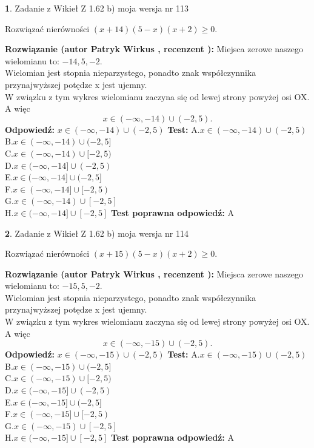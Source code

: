 \documentclass[12pt, a4paper]{article}
\theoremstyle{definition} %
\newtheorem{zad}{}
\newcommand{\zadStart}[1]{\begin{zad}#1\newline}
\newcommand{\zadStop}{\end{zad}}
\newcommand{\rozwStart}[2]{\noindent \textbf{Rozwiązanie (autor #1 , recenzent #2): }\newline}
\newcommand{\rozwStop}{\newline}
\newcommand{\odpStart}{\noindent \textbf{Odpowiedź:}\newline}
\newcommand{\odpStop}{\newline}
\newcommand{\testStart}{\noindent \textbf{Test:}\newline}
\newcommand{\testStop}{\newline}
\newcommand{\kluczStart}{\noindent \textbf{Test poprawna odpowiedź:}\newline}
\newcommand{\kluczStop}{\newline}
\begin{document}
\zadStart{Zadanie z Wikieł Z 1.62 b) moja wersja nr 113}

Rozwiązać nierówności $(x+14)(5-x)(x+2)\ge0$.
\zadStop
\rozwStart{Patryk Wirkus}{}
Miejsca zerowe naszego wielomianu to: $-14, 5, -2$.\\
Wielomian jest stopnia nieparzystego, ponadto znak współczynnika przy\linebreak najwyższej potędze x jest ujemny.\\ W związku z tym wykres wielomianu zaczyna się od lewej strony powyżej osi OX. A więc $$x \in (-\infty,-14) \cup (-2,5).$$
\rozwStop
\odpStart
$x \in (-\infty,-14) \cup (-2,5)$
\odpStop
\testStart
A.$x \in (-\infty,-14) \cup (-2,5)$\\
B.$x \in (-\infty,-14) \cup (-2,5]$\\
C.$x \in (-\infty,-14) \cup [-2,5)$\\
D.$x \in (-\infty,-14] \cup (-2,5)$\\
E.$x \in (-\infty,-14] \cup (-2,5]$\\
F.$x \in (-\infty,-14] \cup [-2,5)$\\
G.$x \in (-\infty,-14) \cup [-2,5]$\\
H.$x \in (-\infty,-14] \cup [-2,5]$
\testStop
\kluczStart
A
\kluczStop



\zadStart{Zadanie z Wikieł Z 1.62 b) moja wersja nr 114}

Rozwiązać nierówności $(x+15)(5-x)(x+2)\ge0$.
\zadStop
\rozwStart{Patryk Wirkus}{}
Miejsca zerowe naszego wielomianu to: $-15, 5, -2$.\\
Wielomian jest stopnia nieparzystego, ponadto znak współczynnika przy\linebreak najwyższej potędze x jest ujemny.\\ W związku z tym wykres wielomianu zaczyna się od lewej strony powyżej osi OX. A więc $$x \in (-\infty,-15) \cup (-2,5).$$
\rozwStop
\odpStart
$x \in (-\infty,-15) \cup (-2,5)$
\odpStop
\testStart
A.$x \in (-\infty,-15) \cup (-2,5)$\\
B.$x \in (-\infty,-15) \cup (-2,5]$\\
C.$x \in (-\infty,-15) \cup [-2,5)$\\
D.$x \in (-\infty,-15] \cup (-2,5)$\\
E.$x \in (-\infty,-15] \cup (-2,5]$\\
F.$x \in (-\infty,-15] \cup [-2,5)$\\
G.$x \in (-\infty,-15) \cup [-2,5]$\\
H.$x \in (-\infty,-15] \cup [-2,5]$
\testStop
\kluczStart
A
\kluczStop
\end{document}
